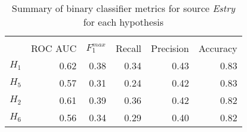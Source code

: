 \begin{table}[htbp!] \centering
\caption{Summary of binary classifier metrics for source \textit{Estry} for each hypothesis}
\label{tab:411_metrics_summary_Estry}
\begin{tabular}{lrrrrr}
\\[-1.8ex]\hline\hline \\[-1.8ex]
 & ROC AUC & $F_1^{max}$ & Recall & Precision & Accuracy \\
\midrule
$H_1$ & 0.62 & 0.38 & 0.34 & 0.43 & 0.83 \\
$H_5$ & 0.57 & 0.31 & 0.24 & 0.42 & 0.83 \\
$H_2$ & 0.61 & 0.39 & 0.36 & 0.42 & 0.82 \\
$H_6$ & 0.56 & 0.34 & 0.29 & 0.40 & 0.82 \\
\bottomrule
\end{tabular}
\end{table}
